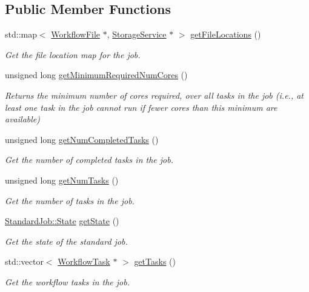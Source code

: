 \subsection*{Public Member Functions}
\begin{DoxyCompactItemize}
\item 
std\+::map$<$ \hyperlink{classwrench_1_1_workflow_file}{Workflow\+File} $\ast$, \hyperlink{classwrench_1_1_storage_service}{Storage\+Service} $\ast$ $>$ \hyperlink{classwrench_1_1_standard_job_ad68649e960b3b35b15ec0dafd6037e23}{get\+File\+Locations} ()
\begin{DoxyCompactList}\small\item\em Get the file location map for the job. \end{DoxyCompactList}\item 
unsigned long \hyperlink{classwrench_1_1_standard_job_a5b49ae2d2fcf93e5d5b452b9d14d0a1f}{get\+Minimum\+Required\+Num\+Cores} ()
\begin{DoxyCompactList}\small\item\em Returns the minimum number of cores required, over all tasks in the job (i.\+e., at least one task in the job cannot run if fewer cores than this minimum are available) \end{DoxyCompactList}\item 
unsigned long \hyperlink{classwrench_1_1_standard_job_a7dfe8f307875dcf375fea01bbd9b0fb6}{get\+Num\+Completed\+Tasks} ()
\begin{DoxyCompactList}\small\item\em Get the number of completed tasks in the job. \end{DoxyCompactList}\item 
unsigned long \hyperlink{classwrench_1_1_standard_job_a5672a5454c94741589dde8edd8d9c56f}{get\+Num\+Tasks} ()
\begin{DoxyCompactList}\small\item\em Get the number of tasks in the job. \end{DoxyCompactList}\item 
\hyperlink{classwrench_1_1_standard_job_adad8bdfd5eb774da5be290864ce89c67}{Standard\+Job\+::\+State} \hyperlink{classwrench_1_1_standard_job_a1fd45aa2f3ab8818d7bbf6d8d6a31a5c}{get\+State} ()
\begin{DoxyCompactList}\small\item\em Get the state of the standard job. \end{DoxyCompactList}\item 
std\+::vector$<$ \hyperlink{classwrench_1_1_workflow_task}{Workflow\+Task} $\ast$ $>$ \hyperlink{classwrench_1_1_standard_job_a122e212d0136c5559b7fc38b58f8c377}{get\+Tasks} ()
\begin{DoxyCompactList}\small\item\em Get the workflow tasks in the job. \end{DoxyCompactList}\end{DoxyCompactItemize}
